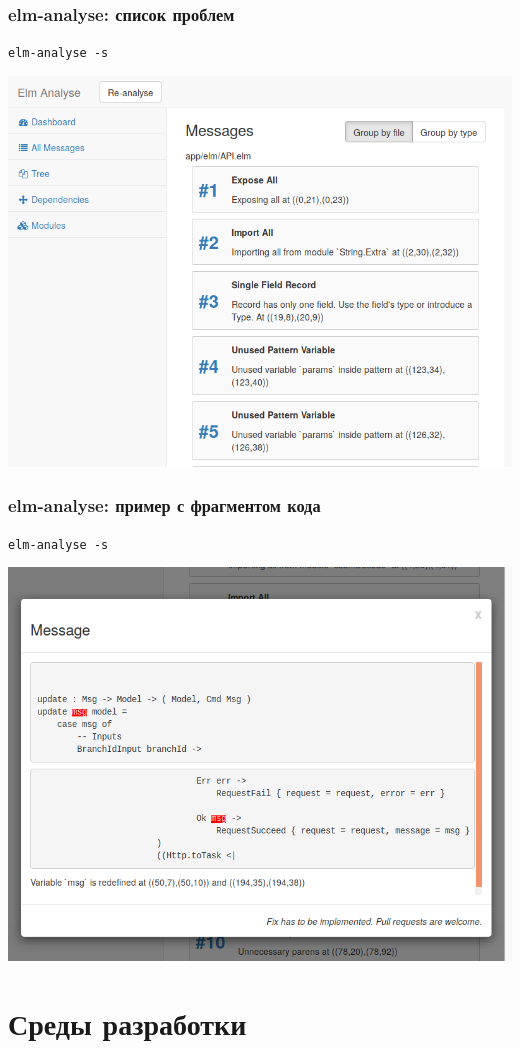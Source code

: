 \documentclass[11pt,aspectratio=169]{beamer}
\begin{document}
\begin{frame}
\frametitle{elm-analyse: список проблем}
\center\texttt{elm-analyse -s}

\includegraphics[scale=0.3]{elm-analyse-in-browser-problems}
\end{frame}

\begin{frame}
\frametitle{elm-analyse: пример с фрагментом кода}
\center\texttt{elm-analyse -s}

\includegraphics[scale=0.3]{elm-analyse-in-browser-redefine-sample}
\end{frame}

\section{Среды разработки}
\end{document}

